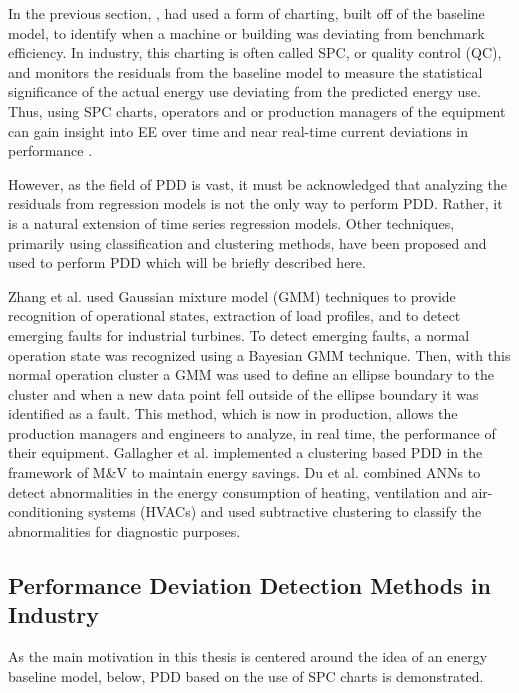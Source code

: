 In the previous section, \cite{tightening}\cite{cas}\cite{boiler}, had used a form of charting, built off of the baseline model, to identify when a machine or building was deviating from benchmark efficiency. In industry, this charting is often called SPC, or quality control (QC), and monitors the residuals from the baseline model to measure the statistical significance of the actual energy use deviating from the predicted energy use. Thus, using SPC charts, operators and or production managers of the equipment can gain insight into EE over time and near real-time current deviations in performance \cite{oakland_statistical_2008}.

However, as the field of PDD is vast, it must be acknowledged that analyzing the residuals from regression models is not the only way to perform PDD. Rather, it is a natural extension of time series regression models. Other techniques, primarily using classification and clustering methods, have been proposed and used to perform PDD which will be briefly described here.

Zhang et al. \cite{gas-turbine-faults} used Gaussian mixture model (GMM) techniques to provide recognition of operational states, extraction of load profiles, and to detect emerging faults for industrial turbines. To detect emerging faults, a normal operation state was recognized using a Bayesian GMM technique. Then, with this normal operation cluster a GMM was used to define an ellipse boundary to the cluster and when a new data point fell outside of the ellipse boundary it was identified as a fault. This method, which is now in production, allows the production managers and engineers to analyze, in real time, the performance of their equipment. Gallagher et al. \cite{intelliMAV} implemented a clustering based PDD in the framework of M&V to maintain energy savings. Du et al. \cite{fault-HVAC} combined ANNs to detect abnormalities in the energy consumption of heating, ventilation and air-conditioning systems (HVACs) and used subtractive clustering to classify the abnormalities for diagnostic purposes.

\subsection{Performance Deviation Detection Methods in Industry}

As the main motivation in this thesis is centered around the idea of an energy baseline model, below, PDD based on the use of SPC charts is demonstrated.

